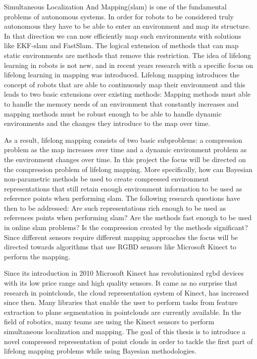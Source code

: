 \documentclass[twoside,hidelinks]{article}
\begin{document}
Simultaneous Localization And Mapping(slam) is one of the fundamental problems of autonomous systems\cite{probRobs}. In order for robots to be considered truly autonomous they have to be able to enter an environment and map its structure. In that direction we can now efficiently map such environments with solutions like EKF-slam\cite{ekf} and FastSlam\cite{slam}. The logical extension of methods that can map static environments are methods that remove this restriction. The idea of lifelong learning in robots is not new\cite{liflonglearning}, and in recent years research with a specific focus on lifelong learning in mapping\cite{lifelongmaps} was introduced.  Lifelong mapping introduces the concept of robots that are able to continuously map their environment and this leads to two basic extensions over existing methods: Mapping methods must able to handle the memory needs of an environment that constantly increases and mapping methods must be robust enough to be able to handle dynamic environments and the changes they introduce to the map over time.

As a result, lifelong mapping consists of two basic subproblems: a compression problem as the map increases over time and a dynamic environment problem as the environment changes over time\cite{aishalong}. In this project the focus will be directed on the compression problem of lifelong mapping. More specifically, how can Bayesian non-parametric methods be used to create compressed environment representations that still retain enough environment information to be used as reference points when performing slam. The following research questions have then to be addressed: Are such representations rich enough to be used as references points when performing slam? Are the methods fast enough to be used in online slam problems? Is the compression created by the methods significant? Since different sensors require different mapping approaches the focus will be directed towards algorithms that use RGBD sensors like Microsoft Kinect to perform the mapping. 

Since its introduction in 2010 Microsoft Kinect\cite{kinect} has revolutionized rgbd devices with its low price range and high quality sensors. It came as no surprise that research in pointclouds, the cloud representation system of Kinect, has increased since then. Many libraries that enable the user to perform tasks from feature extraction to plane segmentation\cite{pcl} in pointclouds are currently available. In the field of robotics, many teams are using the Kinect sensors to perform simultaneous localization and mapping\cite{rtabmap}. The goal of this thesis is to introduce a novel compressed representation of point clouds in order to tackle the first part of lifelong mapping problems while using Bayesian methodologies. 
\end{document}
